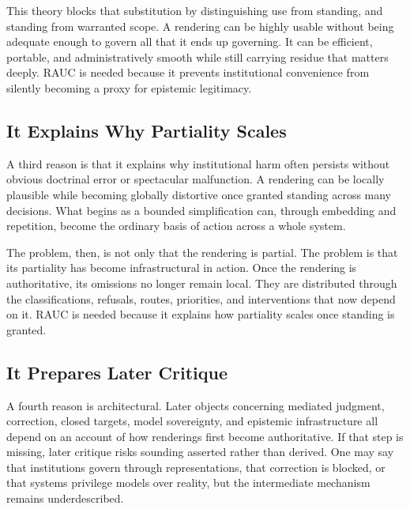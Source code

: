 \documentclass[11pt]{article}
\begin{document}
This theory blocks that substitution by distinguishing use from standing, and standing from warranted scope. A rendering can be highly usable without being adequate enough to govern all that it ends up governing. It can be efficient, portable, and administratively smooth while still carrying residue that matters deeply. RAUC is needed because it prevents institutional convenience from silently becoming a proxy for epistemic legitimacy.

\subsection{It Explains Why Partiality Scales}

A third reason is that it explains why institutional harm often persists without obvious doctrinal error or spectacular malfunction. A rendering can be locally plausible while becoming globally distortive once granted standing across many decisions. What begins as a bounded simplification can, through embedding and repetition, become the ordinary basis of action across a whole system.\cite{BowkerStar1999SortingThingsOut,Scott1998SeeingLikeState,Eubanks2018AutomatingInequality}

The problem, then, is not only that the rendering is partial. The problem is that its partiality has become infrastructural in action. Once the rendering is authoritative, its omissions no longer remain local. They are distributed through the classifications, refusals, routes, priorities, and interventions that now depend on it. RAUC is needed because it explains how partiality scales once standing is granted.

\subsection{It Prepares Later Critique}

A fourth reason is architectural. Later objects concerning mediated judgment, correction, closed targets, model sovereignty, and epistemic infrastructure all depend on an account of how renderings first become authoritative. If that step is missing, later critique risks sounding asserted rather than derived. One may say that institutions govern through representations, that correction is blocked, or that systems privilege models over reality, but the intermediate mechanism remains underdescribed.\cite{Swanson2026ConstrainedDescribability,Swanson2026ConstraintConditionDisclosure,Swanson2026MediatedJudgmentConstraint}
\end{document}
